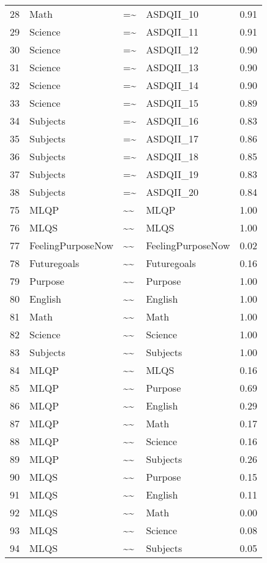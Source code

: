 \documentclass{article}\usepackage[]{graphicx}\usepackage[]{color}
\begin{document}
\begin{table}[ht]
\begin{tabular}{rlllr}
  28 & Math & =\~{} & ASDQII\_10 & 0.91 \\ 
  29 & Science & =\~{} & ASDQII\_11 & 0.91 \\ 
  30 & Science & =\~{} & ASDQII\_12 & 0.90 \\ 
  31 & Science & =\~{} & ASDQII\_13 & 0.90 \\ 
  32 & Science & =\~{} & ASDQII\_14 & 0.90 \\ 
  33 & Science & =\~{} & ASDQII\_15 & 0.89 \\ 
  34 & Subjects & =\~{} & ASDQII\_16 & 0.83 \\ 
  35 & Subjects & =\~{} & ASDQII\_17 & 0.86 \\ 
  36 & Subjects & =\~{} & ASDQII\_18 & 0.85 \\ 
  37 & Subjects & =\~{} & ASDQII\_19 & 0.83 \\ 
  38 & Subjects & =\~{} & ASDQII\_20 & 0.84 \\ 
  75 & MLQP & \~{}\~{} & MLQP & 1.00 \\ 
  76 & MLQS & \~{}\~{} & MLQS & 1.00 \\ 
  77 & FeelingPurposeNow & \~{}\~{} & FeelingPurposeNow & 0.02 \\ 
  78 & Futuregoals & \~{}\~{} & Futuregoals & 0.16 \\ 
  79 & Purpose & \~{}\~{} & Purpose & 1.00 \\ 
  80 & English & \~{}\~{} & English & 1.00 \\ 
  81 & Math & \~{}\~{} & Math & 1.00 \\ 
  82 & Science & \~{}\~{} & Science & 1.00 \\ 
  83 & Subjects & \~{}\~{} & Subjects & 1.00 \\ 
  84 & MLQP & \~{}\~{} & MLQS & 0.16 \\ 
  85 & MLQP & \~{}\~{} & Purpose & 0.69 \\ 
  86 & MLQP & \~{}\~{} & English & 0.29 \\ 
  87 & MLQP & \~{}\~{} & Math & 0.17 \\ 
  88 & MLQP & \~{}\~{} & Science & 0.16 \\ 
  89 & MLQP & \~{}\~{} & Subjects & 0.26 \\ 
  90 & MLQS & \~{}\~{} & Purpose & 0.15 \\ 
  91 & MLQS & \~{}\~{} & English & 0.11 \\ 
  92 & MLQS & \~{}\~{} & Math & 0.00 \\ 
  93 & MLQS & \~{}\~{} & Science & 0.08 \\ 
  94 & MLQS & \~{}\~{} & Subjects & 0.05 \\ 

\end{tabular}
\end{table}
\end{document}
